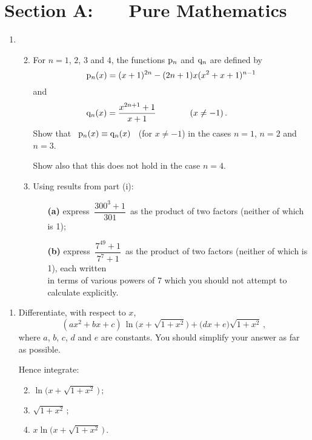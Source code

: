 \documentclass[a4, 11pt]{report}
\newlength{\qspace}
\newcounter{qnumber}
\newenvironment{question}%
 {\vspace{\qspace}
  \begin{enumerate}[\bfseries 1\quad][10]%
    \setcounter{enumi}{\value{qnumber}}%
    \item%
 }
{
  \end{enumerate}
  \filbreak
  \stepcounter{qnumber}
 }
\newenvironment{questionparts}[1][1]%
 {
  \begin{enumerate}[\bfseries (i)]%
    \setcounter{enumii}{#1}
    \addtocounter{enumii}{-1}
    \setlength{\itemsep}{5mm}
    \setlength{\parskip}{8pt}
 }
 {
  \end{enumerate}
 }
\def\p{{\rm p}}
\def\q{{\rm q}}
\begin{document}
\setcounter{page}{2}

 
\section*{Section A: \ \ \ Pure Mathematics}

\begin{question}
\begin{questionparts}
\item
For $n=1$, $2$, $3$ and $4$, the functions $\p_n$ and $\q_n$ are
defined by
\[
\p_n(x) = (x+1)^{2n} - (2n+1)x (x^2+x+1)^{n-1}
\]
and 
\[
\q_n(x) = \frac{x^{2n+1}+1}{x+1}
\ \ \ \ \ \ \ \ \ \ \ \ (x\ne -1)
\,.  \ \ \ \ \ \ \ \ \ \   
\]
Show that
 \ $\p_n(x)\equiv \q_n(x)$ \ 
(for $x\ne-1$)
 in the cases $n=1$, $n=2$ and $n=3$.

Show also that this does not hold in the case $n=4$.




\item Using  results from part (i):   

\begin{itemize}
\item[\bf (a)] 
express
$ \ \dfrac {300^3 +1}{301}\,$
 as the product of two factors (neither of which is 1);
\\

\item[\bf (b)] 
express 
$ \ \dfrac {7^{49}+1}{7^7+1}\,$ as the product of two factors (neither of 
which is 1), each 
written 
\\[1mm]
in terms of 
various powers of 7 which you should not attempt
to calculate explicitly. 
\end{itemize}

\end{questionparts}
\end{question} 



\begin{question}
Differentiate, with respect to $x$,
\[
(ax^2+bx+c)\,\ln  \big( x+\sqrt{1+x^2}\big) +\big(dx+e\big)\sqrt{1+x^2}
\,,
\]
where $a$, $b$, $c$, $d$ and  $e$ are constants. You should simplify your
answer as far as possible.

Hence integrate:
\begin{questionparts}
\item $ \ln \big( x+\sqrt{1+x^2}\,\big) \,;$
\item $\sqrt{1+x^2} \,; $
\item $ x\ln \big( x+\sqrt{1+x^2}\,\big) \,.$

\end{questionparts}
\end{question}
\end{document}
